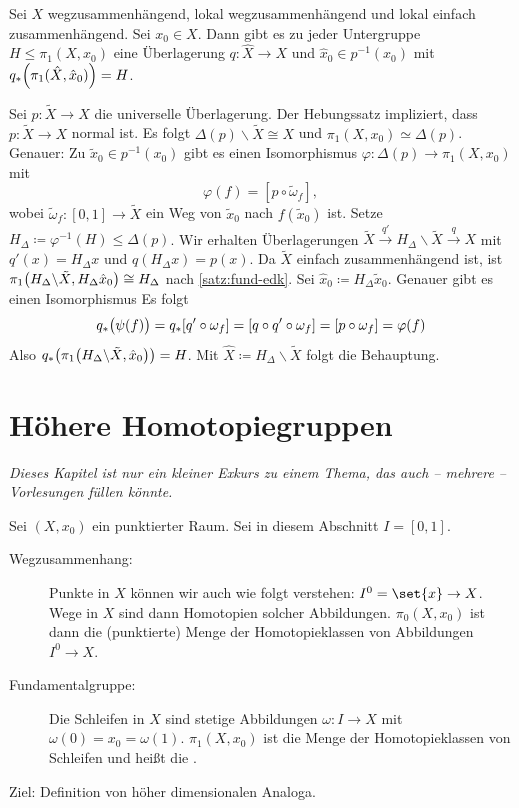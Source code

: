 \begin{satz}[{name={Existenz}}]
	Sei $X$ wegzusammenhängend, lokal wegzusammenhängend und lokal einfach zusammenhängend. Sei $x_0 \in X$. 
	Dann gibt es zu jeder Untergruppe $H \le \pi_1(X,x_0)$ eine Überlagerung $q \colon \hat{X} \to X$ und $\hat{x}_0 \in p^{-1} (x_0)$ mit $q_* \enbrace*{\pi_1(\hat{X}, \hat{x}_0)} = H$.
\end{satz}
\begin{beweis}
	Sei $p \colon \tilde{X} \to X$ die universelle Überlagerung. 
	Der Hebungssatz impliziert, dass $p \colon \tilde{X} \to X$ normal ist. 
	Es folgt $\Delta(p) \backslash \tilde{X} \cong X$ und $\pi_1(X, x_0) \simeq \Delta(p)$. 
	Genauer: Zu $\tilde{x}_0 \in p ^{-1}(x_0)$ gibt es einen Isomorphismus $\varphi \colon \Delta (p) \to \pi_1(X,x_0)$ mit 
	\[
		\varphi(f) = [p \circ \tilde{\omega}_f],
	\]
	wobei $\tilde{\omega}_f \colon [0,1] \to \tilde{X}$ ein Weg von $\tilde{x}_0$ nach $f (\tilde{x}_0)$ ist. 
	Setze $H_\Delta \coloneqq \varphi ^{-1}(H)  \le \Delta(p)$. 
	Wir erhalten Überlagerungen $\tilde{X} \xrightarrow{q'} H_\Delta \backslash \tilde{X} \xrightarrow{q} X $ mit $q'(x) = H_\Delta x$ und $q (H_\Delta x) = p(x)$. 
	Da $\tilde{X}$ einfach zusammenhängend ist, ist $\pi_1 \enbrace*{ H_\Delta \backslash \tilde{X}, H_\Delta \hat{x}_0} \cong H_\Delta$ nach \cref{satz:fund-edk}. 
	Sei $\hat{x}_0 \coloneqq H_\Delta \tilde{x}_0$.
	Genauer gibt es einen Isomorphismus
	Es folgt 
	\[
		q_* \enbrace[\big]{\psi(f)} = q_* \benbrace*{q' \circ \omega_f} = \benbrace*{q \circ q' \circ \omega_f} = \benbrace*{p \circ \omega_f} = \varphi(f) 
	\]
	Also $q_* \enbrace*{\pi_1 \enbrace*{H_\Delta \backslash \tilde{X}, \hat{x}_0}} = H $. 
	Mit $\hat{X} \coloneqq H_\Delta \backslash \tilde{X}$ folgt die Behauptung.
\end{beweis}

\newpage
\section{Höhere Homotopiegruppen} %
\label{sec:hohere_homotopiegruppen}
\emph{Dieses Kapitel ist nur ein kleiner Exkurs zu einem Thema, das auch -- mehrere -- Vorlesungen füllen könnte.}\smallskip

Sei $(X,x_0)$ ein punktierter Raum. Sei in diesem Abschnitt $I= [0,1]$.
\begin{description}
	\item[Wegzusammenhang:] Punkte in $X$ können wir auch wie folgt verstehen: $I^0 = \set{x} \to X$. 
	Wege in $X$ sind dann Homotopien solcher Abbildungen. 
	$\pi_0(X,x_0)$ ist dann die (punktierte) Menge der Homotopieklassen von Abbildungen $I^0 \to X$.
	\item[Fundamentalgruppe:] Die Schleifen in $X$ sind stetige Abbildungen $\omega \colon I\to X$ mit $\omega(0)= x_0 = \omega(1)$. 
	$\pi_1(X,x_0)$ ist die Menge der Homotopieklassen von Schleifen und heißt die .
\end{description}
Ziel: Definition von höher dimensionalen Analoga.

